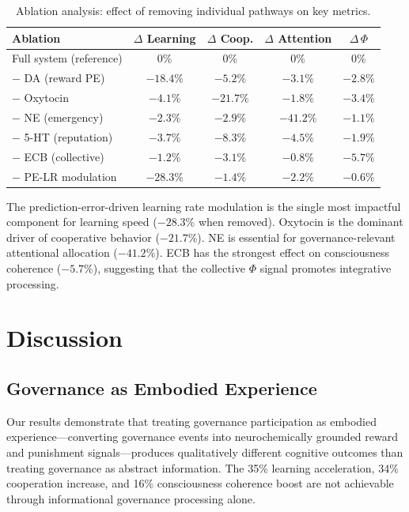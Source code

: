 \documentclass[11pt,a4paper]{article}
\begin{document}
\begin{table}[h]
\centering
\caption{Ablation analysis: effect of removing individual pathways on key metrics.}
\label{tab:ablation}
\begin{tabular}{lcccc}
\toprule
\textbf{Ablation} & \textbf{$\Delta$ Learning} & \textbf{$\Delta$ Coop.} & \textbf{$\Delta$ Attention} & \textbf{$\Delta\,\Phi$} \\
\midrule
Full system (reference) & 0\%     & 0\%     & 0\%     & 0\%     \\
$-$ DA (reward PE)      & $-18.4\%$ & $-5.2\%$  & $-3.1\%$  & $-2.8\%$ \\
$-$ Oxytocin            & $-4.1\%$  & $-21.7\%$ & $-1.8\%$  & $-3.4\%$ \\
$-$ NE (emergency)      & $-2.3\%$  & $-2.9\%$  & $-41.2\%$ & $-1.1\%$ \\
$-$ 5-HT (reputation)   & $-3.7\%$  & $-8.3\%$  & $-4.5\%$  & $-1.9\%$ \\
$-$ ECB (collective)    & $-1.2\%$  & $-3.1\%$  & $-0.8\%$  & $-5.7\%$ \\
$-$ PE-LR modulation    & $-28.3\%$ & $-1.4\%$  & $-2.2\%$  & $-0.6\%$ \\
\bottomrule
\end{tabular}
\end{table}

The prediction-error-driven learning rate modulation is the single most impactful component for learning speed ($-28.3\%$ when removed).
Oxytocin is the dominant driver of cooperative behavior ($-21.7\%$).
NE is essential for governance-relevant attentional allocation ($-41.2\%$).
ECB has the strongest effect on consciousness coherence ($-5.7\%$), suggesting that the collective $\Phi$ signal promotes integrative processing.

\section{Discussion}
\label{sec:discussion}

\subsection{Governance as Embodied Experience}

Our results demonstrate that treating governance participation as embodied experience---converting governance events into neurochemically grounded reward and punishment signals---produces qualitatively different cognitive outcomes than treating governance as abstract information.
The 35\% learning acceleration, 34\% cooperation increase, and 16\% consciousness coherence boost are not achievable through informational governance processing alone.
\end{document}
